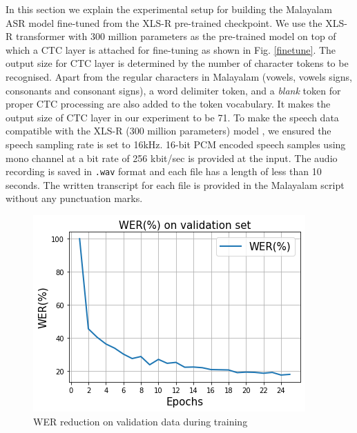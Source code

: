 \documentclass[runningheads]{llncs}
\begin{document}
In this section we explain the experimental setup for building the Malayalam ASR model fine-tuned from the XLS-R pre-trained checkpoint. We use the  XLS-R  transformer with 300 million parameters as the pre-trained model on top of which a CTC layer is attached for fine-tuning as shown in Fig. \ref{finetune}. The output size for CTC layer is determined by the number of character tokens to be recognised. Apart from the regular characters in Malayalam (vowels, vowels signs, consonants and consonant signs), a word delimiter token, and a \textit{blank} token for proper CTC processing are also added to the token vocabulary. It makes the output size of CTC layer in our experiment to be 71. To make the speech data compatible with the XLS-R (300 million parameters) model \cite{babu2021xls}, we ensured the speech sampling rate is set to 16kHz.  16-bit PCM encoded speech samples using mono channel at a bit rate of 256 kbit/sec is provided at the input. The audio recording is saved in \texttt{.wav} format and each file has a length of less than 10 seconds. The written transcript for each file is provided in the Malayalam script without any punctuation marks.







\begin{figure}[htpb]
    \centering
    \includegraphics[width=0.8\linewidth, height=0.4\linewidth]{WER.png}
    \caption{WER reduction on validation data during training}
    \label{Fig:WER}

\end{figure}
\end{document}
